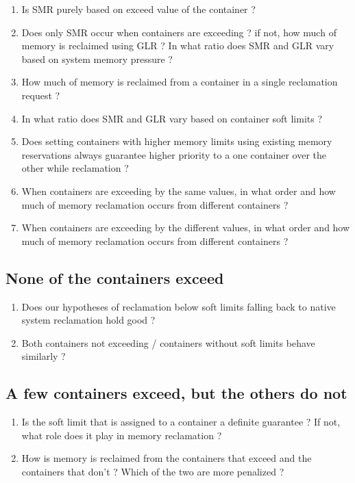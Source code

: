       \begin{enumerate}
	\item Is SMR purely based on exceed value of the container ?
	\item Does only SMR occur when containers are exceeding ? if not, how much of memory is reclaimed using GLR ?  In what ratio does 
SMR and GLR vary based on system memory pressure ?
	\item How much of memory is reclaimed from a container in a single reclamation request ?
	\item In what ratio does SMR and GLR vary based on container soft limits ?
	
	\item Does setting containers with higher memory limits using existing memory reservations always guarantee higher priority to a 
one container over the other while reclamation ?
	\item When containers are exceeding by the same values, in what order and how much of memory reclamation occurs from different 
containers ?
	\item When containers are exceeding by the different values, in what order and how much of memory reclamation occurs from different 
containers ?
      \end{enumerate}
  
  \subsection{None of the containers exceed}
  
    \begin{enumerate}
      \item Does our hypotheses of reclamation below soft limits falling back to native system reclamation hold good ?
      \item Both containers not exceeding / containers without soft limits behave similarly ? 
    \end{enumerate}
  
  \subsection{A few containers exceed, but the others do not}
  
    \begin{enumerate}
      \item Is the soft limit that is assigned to a container a definite guarantee ? If not, what role does it play in memory reclamation ?
      \item How is memory is reclaimed from the containers that exceed and the containers that don’t ? Which of the two are more penalized ?
    \end{enumerate}
  
